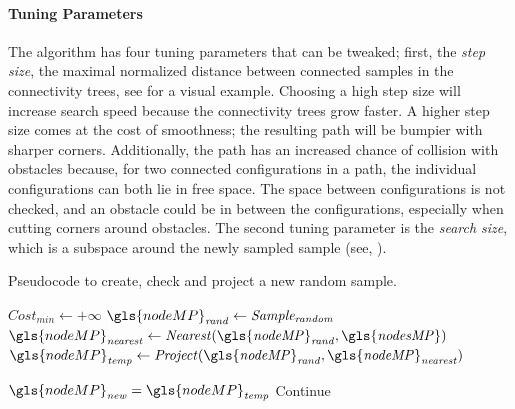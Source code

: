 \paragraph{Tuning Parameters}
The algorithm has four tuning parameters that can be tweaked; first, the \textit{step size}, the maximal normalized distance between connected samples in the connectivity trees, see  for a visual example. Choosing a high step size will increase search speed because the connectivity trees grow faster. A higher step size comes at the cost of smoothness; the resulting path will be bumpier with sharper corners. Additionally, the path has an increased chance of collision with obstacles because, for two connected configurations in a path, the individual configurations can both lie in free space. The space between configurations is not checked, and an obstacle could be in between the configurations, especially when cutting corners around obstacles. The second tuning parameter is the \textit{search size}, which is a subspace around the newly sampled sample (see, ).\bs

\begin{algorithm}[H]
\caption{Pseudocode to create, check and project a new random sample.}%
\label{pseudocode:proposed_rrt_star_one}
\begin{algorithmic}[1]
  \hspace{-0.9cm}\colorbox{my_light_blue}{\parbox{\linewidth}{%
    \State $Cost_\mathit{min} \leftarrow +\infty$ 
    \State $\gls{nodeMP}_\mathit{rand} \leftarrow \mathit{Sample_{random}}$
    \State $\gls{nodeMP}_\mathit{nearest} \leftarrow \mathit{Nearest(\gls{nodeMP}_{rand}, \gls{nodesMP})}$
    \State $\gls{nodeMP}_\mathit{temp} \leftarrow \mathit{Project(\gls{nodeMP}_{rand}, \gls{nodeMP}_{nearest})}$

    \State $\gls{nodeMP}_\mathit{new} = \gls{nodeMP}_\mathit{temp}$
    \Else
        \State Continue
    \EndIf
}}
\end{algorithmic}
\end{algorithm}

